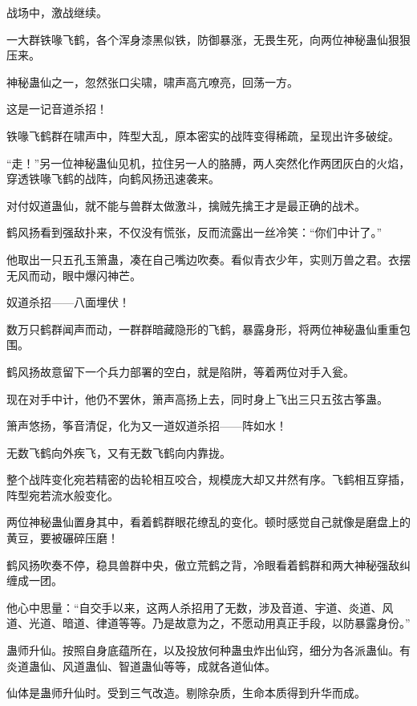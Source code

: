 
\begin{this_body}



战场中，激战继续。

一大群铁喙飞鹤，各个浑身漆黑似铁，防御暴涨，无畏生死，向两位神秘蛊仙狠狠压来。

神秘蛊仙之一，忽然张口尖啸，啸声高亢嘹亮，回荡一方。

这是一记音道杀招！

铁喙飞鹤群在啸声中，阵型大乱，原本密实的战阵变得稀疏，呈现出许多破绽。

“走！”另一位神秘蛊仙见机，拉住另一人的胳膊，两人突然化作两团灰白的火焰，穿透铁喙飞鹤的战阵，向鹤风扬迅速袭来。

对付奴道蛊仙，就不能与兽群太做激斗，擒贼先擒王才是最正确的战术。

鹤风扬看到强敌扑来，不仅没有慌张，反而流露出一丝冷笑：“你们中计了。”

他取出一只五孔玉箫蛊，凑在自己嘴边吹奏。看似青衣少年，实则万兽之君。衣摆无风而动，眼中爆闪神芒。

奴道杀招——八面埋伏！

数万只鹤群闻声而动，一群群暗藏隐形的飞鹤，暴露身形，将两位神秘蛊仙重重包围。

鹤风扬故意留下一个兵力部署的空白，就是陷阱，等着两位对手入瓮。

现在对手中计，他仍不罢休，箫声高扬上去，同时身上飞出三只五弦古筝蛊。

箫声悠扬，筝音清促，化为又一道奴道杀招——阵如水！

无数飞鹤向外疾飞，又有无数飞鹤向内靠拢。

整个战阵变化宛若精密的齿轮相互咬合，规模庞大却又井然有序。飞鹤相互穿插，阵型宛若流水般变化。

两位神秘蛊仙置身其中，看着鹤群眼花缭乱的变化。顿时感觉自己就像是磨盘上的黄豆，要被碾碎压磨！

鹤风扬吹奏不停，稳具兽群中央，傲立荒鹤之背，冷眼看着鹤群和两大神秘强敌纠缠成一团。

他心中思量：“自交手以来，这两人杀招用了无数，涉及音道、宇道、炎道、风道、光道、暗道、律道等等。乃是故意为之，不愿动用真正手段，以防暴露身份。”

蛊师升仙。按照自身底蕴所在，以及投放何种蛊虫炸出仙窍，细分为各派蛊仙。有炎道蛊仙、风道蛊仙、智道蛊仙等等，成就各道仙体。

仙体是蛊师升仙时。受到三气改造。剔除杂质，生命本质得到升华而成。


\end{this_body}
